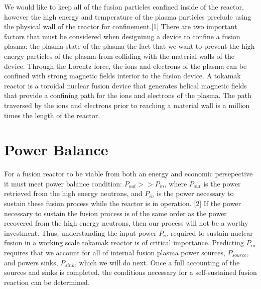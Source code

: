\documentclass{article}
\begin{document}
We would like to keep all of the fusion particles confined inside of the reactor, however the high energy and temperature of the plasma particles preclude using the physical wall of the reactor for confinement.[1] There are two important factors that must be considered when designinng a device to confine a fusion plasma: the plasma state of the plasma the fact that we want to prevent the high energy particles of the plasma from colliding with the material walls of the device. Through the Lorentz force, the ions and electrons of the plasma can be confined with strong magnetic fields interior to the fusion device. A tokamak reactor is a toroidal nuclear fusion device that generates helical magnetic fields that provide a confining path for the ions and electrons of the plasma. The path traversed by the ions and electrons prior to reaching a material wall is a million times the length of the reactor.\\
\newline
\section{Power Balance}
For a fusion reactor to be viable from both an energy and economic persepective it must meet power balance condition: $P_{out} >> P_{in}$, where $P_{out}$ is the power retrieved from the high energy neutrons, and $P_{in}$ is the power necessary to sustain these fusion process while the reactor is in operation. [2] If the power necessary to sustain the fusion process is of the same order as the power recovered from the high energy neutrons, then our process will not be a worthy investment. Thus, understanding the input power $P_{in}$ required to sustain nuclear fusion in a working scale tokamak reactor is of critical importance. Predicting $P_{in}$ requires that we account for all of internal fusion plasma power sources, $P_{source}$, and powers sinks, $P_{sink}$, which we will do next. Once a full accounting of the sources and sinks is completed, the conditions necessary for a self-sustained fusion reaction can be determined. \\
\end{document}
